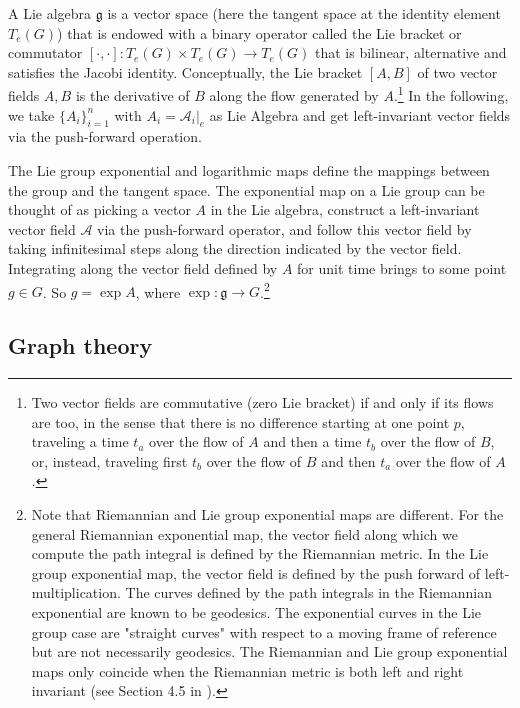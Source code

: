 \documentclass{article}
\begin{document}
A Lie algebra $\mathfrak{g}$ is a vector space (here the tangent space at the identity element $T_e(G)$) that is endowed with a binary operator called the Lie bracket or commutator $[\cdot, \cdot] : T_e(G) \times T_e(G) \to T_e(G)$ that is bilinear, alternative and satisfies the Jacobi identity. Conceptually, the Lie bracket $[A, B]$ of two vector fields $A, B$ is the derivative of $B$ along the flow generated by $A$.\footnote{Two vector fields are commutative (zero Lie bracket) if and only if its flows are too, in the sense that there is no difference starting at one point $p$, traveling a time $t_a$ over the flow of $A$ and then a time $t_b$ over the flow of $B$, or, instead, traveling first $t_b$ over the flow of $B$ and then $t_a$ over the flow of $A$.} In the following, we take $\{A_i\}_{i=1}^n$ with $A_i = \mathcal{A}_i|_e$ as Lie Algebra and get left-invariant vector fields via the push-forward operation. 

The Lie group exponential and logarithmic maps define the mappings between the group and the tangent space. The exponential map on a Lie group can be thought of as picking a vector $A$ in the Lie algebra, construct a left-invariant vector field $\mathcal{A}$ via the push-forward operator, and follow this vector field by taking infinitesimal steps along the direction indicated by the vector field. Integrating along the vector field defined by $A$ for unit time brings to some point $g \in G$. So $g = \exp A$, where $\exp: \mathfrak{g} \to G$.\footnote{Note that Riemannian and Lie group exponential maps are different. For the general Riemannian exponential map, the vector field along which we compute the path integral is defined by the Riemannian metric. In the Lie group exponential map, the vector field is defined by the push forward of left-multiplication. The curves defined by the path integrals in the Riemannian exponential are known to be geodesics. The exponential curves in the Lie group case are "straight curves" with respect to a moving frame of reference but are not necessarily geodesics. The Riemannian and Lie group exponential maps only coincide when the Riemannian metric is both left and right invariant (see Section 4.5 in \citet{bekkers2017thesis}).}



\subsection{Graph theory} \label{app:graph_theory}
\end{document}
